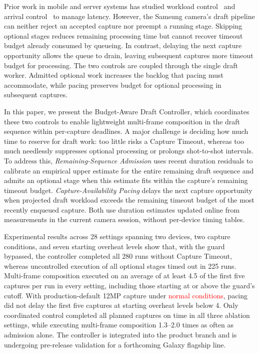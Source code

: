 Prior work in mobile and server systems has studied workload control~\cite{approxdet-sensys,timecard-sosp,klein-brownout} and arrival control~\cite{seda-sosp,dagor-socc,breakwater-osdi} to manage latency.
However, the Samsung camera's draft pipeline can neither reject an accepted capture nor preempt a running stage.
Skipping optional stages reduces remaining processing time but cannot recover timeout budget already consumed by queueing.
In contrast, delaying the next capture opportunity allows the queue to drain, leaving subsequent captures more timeout budget for processing.
The two controls are coupled through the single draft worker.
Admitted optional work increases the backlog that pacing must accommodate, while pacing preserves budget for optional processing in subsequent captures.

In this paper, we present the Budget-Aware Draft Controller, which coordinates these two controls to enable lightweight multi-frame composition in the draft sequence within per-capture deadlines.
A major challenge is deciding how much time to reserve for draft work: too little risks a Capture Timeout, whereas too much needlessly suppresses optional processing or prolongs shot-to-shot intervals.
To address this, \emph{Remaining-Sequence Admission} uses recent duration residuals to calibrate an empirical upper estimate for the entire remaining draft sequence and admits an optional stage when this estimate fits within the capture's remaining timeout budget.
\emph{Capture-Availability Pacing} delays the next capture opportunity when projected draft workload exceeds the remaining timeout budget of the most recently enqueued capture.
Both use duration estimates updated online from measurements in the current camera session, without per-device timing tables.

Experimental results across 28 settings spanning two devices, two capture conditions, and seven starting overheat levels show that, with the guard bypassed, the controller completed all 280 runs without Capture Timeout, whereas uncontrolled execution of all optional stages timed out in 225 runs.
Multi-frame composition executed on an average of at least 4.5 of the first five captures per run in every setting, including those starting at or above the guard's cutoff.
With production-default 12MP capture under \textcolor{red}{normal conditions}, pacing did not delay the first five captures at starting overheat levels below 4.
Only coordinated control completed all planned captures on time in all three ablation settings, while executing multi-frame composition 1.3--2.0 times as often as admission alone.
The controller is integrated into the product branch and is undergoing pre-release validation for a forthcoming Galaxy flagship line.

